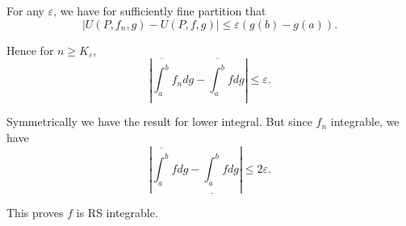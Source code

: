 For any $\varepsilon$, we have for sufficiently fine partition that
\[
	\left| U(P, f_n, g) - U(P, f, g) \right| \le \varepsilon\left( g(b) - g(a) \right) 
.\] 

Hence for $n \ge K_\varepsilon$,
\[
	\left| \overline{\int _a^b} f_n dg - \overline{\int _a^b}f dg   \right| \le \varepsilon
.\] 

Symmetrically we have the result for lower integral. But since $f_n$ integrable, we have
\[
	\left| \overline{\int _a^b} f dg - \underline{\int _a^b}f dg  \right|  \le  2 \varepsilon
.\] 

This proves $f$ is RS integrable.
